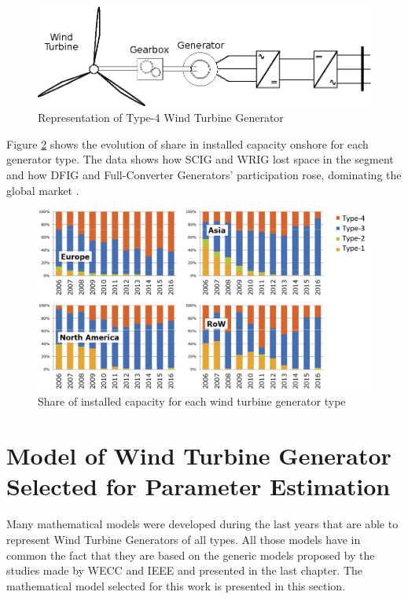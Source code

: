 \begin{figure}[h]
	\caption{Representation of Type-4 Wind Turbine Generator}
	\begin{center}
		\includegraphics[scale=1]{Images/Type4WTG.eps}
	\end{center}
	\label{fig: WTG4}
\end{figure}

Figure \ref{fig: WindShare} shows the evolution of share in installed capacity onshore for each generator type. The data shows how SCIG and WRIG lost space in the segment and how DFIG and Full-Converter Generators' participation rose, dominating the global market \cite{Magagna2017}.

\begin{figure}[h]
	\caption{Share of installed capacity for each wind turbine generator type}
	\begin{center}
		\includegraphics[scale=.2]{Images/WTGTypes.jpg}
	\end{center}
	\label{fig: WindShare}
\end{figure}

\section{Model of Wind Turbine Generator Selected for Parameter Estimation}

Many mathematical models were developed during the last years that are able to represent Wind Turbine Generators of all types. All those models have in common the fact that they are based on the generic models proposed by the studies made by WECC and IEEE and presented in the last chapter. The mathematical model selected for this work is presented in this section.

